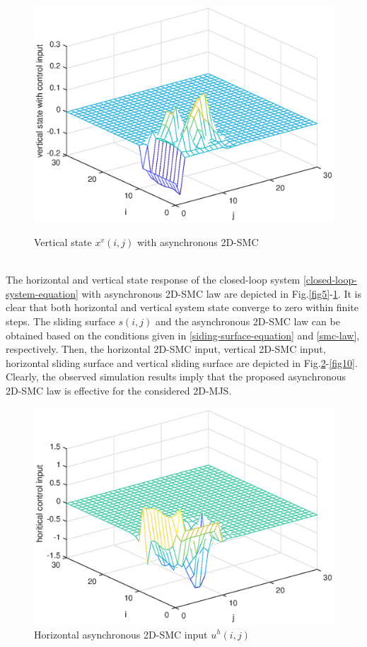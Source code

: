 \documentclass[conference]{IEEEtran}
\begin{document}
\begin{figure}[!htb]
	\centering\includegraphics[scale=0.6]{./simulations/v-state-with-force_eps.eps}\\ 
	\caption{Vertical state $x^{v}(i,j)$ with asynchronous 2D-SMC}
	\label{fig6}
\end{figure}
\\The horizontal and vertical state response of the closed-loop system \eqref{closed-loop-system-equation} with asynchronous 2D-SMC law are depicted in Fig.\ref{fig5}-\ref{fig6}. It is clear that both horizontal and vertical system state converge to zero within finite steps. The sliding surface $s(i,j)$ and the asynchronous 2D-SMC law can be obtained based on the conditions given in \eqref{siding-surface-equation} and \eqref{smc-law}, respectively. Then, the horizontal 2D-SMC input, vertical 2D-SMC input, horizontal sliding surface and vertical sliding surface are depicted in Fig.\ref{fig7}-\ref{fig10}.  Clearly, the observed simulation results imply that the proposed asynchronous 2D-SMC law is effective for the considered 2D-MJS.
\begin{figure}[!htb]
	\centering\includegraphics[scale=0.6]{./simulations/h-control-input_eps.eps}
	\caption{Horizontal  asynchronous 2D-SMC input $u^{h}(i,j)$}
	\label{fig7}
\end{figure}
\end{document}
